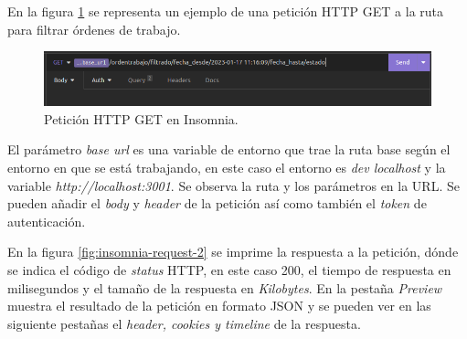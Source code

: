 En la figura \ref{fig:insomnia-request-1} se representa un ejemplo de una petición HTTP GET a la ruta para filtrar órdenes de trabajo.

\begin{figure}[H]
	\centering
	\includegraphics[width=\textwidth]{./Figures/insomnia-request-1.png}
	\caption{Petición HTTP GET en Insomnia.}
	\label{fig:insomnia-request-1}
\end{figure}

El parámetro \textit{base url} es una variable de entorno que trae la ruta base según el entorno en que se está trabajando, en este caso el entorno es \textit{dev localhost} y la variable \textit{http://localhost:3001}. Se observa la ruta y los parámetros en la URL. Se pueden añadir el \textit{body} y \textit{header} de la petición así como también el \textit{token} de autenticación.

En la figura \ref{fig:insomnia-request-2} se imprime la respuesta a la petición, dónde se indica el código de \textit{status} HTTP, en este caso 200, el tiempo de respuesta en milisegundos y el tamaño de la respuesta en \textit{Kilobytes}. En la pestaña \textit{Preview} muestra el resultado de la petición en formato JSON y se pueden ver en las siguiente pestañas el \textit{header, cookies y timeline} de la respuesta. 

